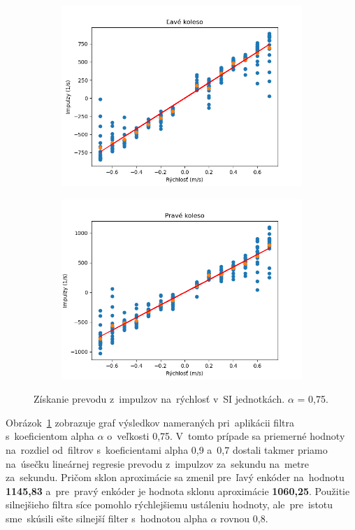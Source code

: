 \begin{figure}[!htbp]
	\begin{subfigure}{0.5\textwidth}
		\includegraphics[width=\textwidth]{img/lw_075250.png}
	\end{subfigure}
	\hfill
	\begin{subfigure}{0.5\textwidth}
		\includegraphics[width=\textwidth]{img/rw_075250.png}
	\end{subfigure}
	\caption{Získanie prevodu z~impulzov na~rýchlosť v~SI jednotkách. \(\alpha\) = 0,75.}
	\label{fig:rw_lw_075250}
\end{figure}

Obrázok~\ref{fig:rw_lw_075250} zobrazuje graf výsledkov nameraných pri~aplikácii filtra s~koeficientom alpha $\alpha$ o~veľkosti
0,75. V~tomto prípade sa priemerné hodnoty na~rozdiel od~filtrov s~koeficientami alpha 0,9 a~0,7 dostali takmer priamo na~úsečku
lineárnej regresie prevodu z~impulzov za~sekundu na~metre za~sekundu. Pričom sklon aproximácie sa zmenil pre~ľavý
enkóder na~hodnotu \textbf{1145,83} a~pre~pravý enkóder je hodnota sklonu aproximácie \textbf{1060,25}. Použitie silnejšieho filtra
síce pomohlo rýchlejšiemu ustáleniu hodnoty, ale~pre~istotu sme~skúsili ešte silnejší filter s~hodnotou alpha $\alpha$ rovnou 0,8.

